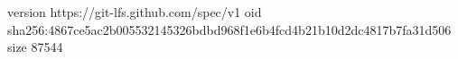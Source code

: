 version https://git-lfs.github.com/spec/v1
oid sha256:4867ce5ac2b005532145326bdbd968f1e6b4fcd4b21b10d2dc4817b7fa31d506
size 87544
